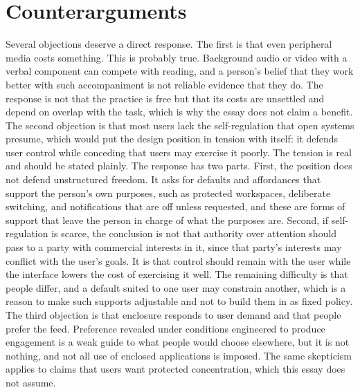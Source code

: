 \documentclass[12pt]{article}
\begin{document}
\section{Counterarguments}

Several objections deserve a direct response. The first is that even peripheral media costs something. This is probably true. Background audio or video with a verbal component can compete with reading, and a person's belief that they work better with such accompaniment is not reliable evidence that they do. The response is not that the practice is free but that its costs are unsettled and depend on overlap with the task, which is why the essay does not claim a benefit. The second objection is that most users lack the self-regulation that open systems presume, which would put the design position in tension with itself: it defends user control while conceding that users may exercise it poorly. The tension is real and should be stated plainly. The response has two parts. First, the position does not defend unstructured freedom. It asks for defaults and affordances that support the person's own purposes, such as protected workspaces, deliberate switching, and notifications that are off unless requested, and these are forms of support that leave the person in charge of what the purposes are. Second, if self-regulation is scarce, the conclusion is not that authority over attention should pass to a party with commercial interests in it, since that party's interests may conflict with the user's goals. It is that control should remain with the user while the interface lowers the cost of exercising it well. The remaining difficulty is that people differ, and a default suited to one user may constrain another, which is a reason to make such supports adjustable and not to build them in as fixed policy. The third objection is that enclosure responds to user demand and that people prefer the feed. Preference revealed under conditions engineered to produce engagement is a weak guide to what people would choose elsewhere, but it is not nothing, and not all use of enclosed applications is imposed. The same skepticism applies to claims that users want protected concentration, which this essay does not assume.
\end{document}
